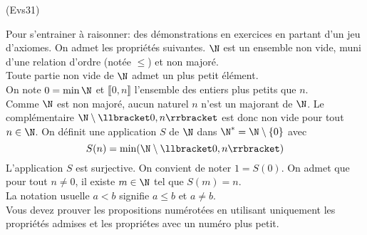 \begin{tiny}(Evs31)\end{tiny} Pour s'entrainer à raisonner: des démonstrations en exercices en partant d'un jeu d'axiomes.\newline
On admet les propriétés suivantes.\newline
$\N$ est un ensemble non vide, muni d'une relation d'ordre (notée $\leq$) et non majoré.\\
Toute partie non vide de $\N$ admet un plus petit élément.\\
On note $0=\min \N$ et $\llbracket 0, n\rrbracket$ l'ensemble des entiers plus petits que $n$.\\
Comme $\N$ est non majoré, aucun naturel $n$ n'est un majorant de $\N$. Le complémentaire $\N\setminus \llbracket 0, n\rrbracket$ est donc non vide pour tout $n\in \N$.
On définit une application $S$ de $\N$ dans $\N^*=\N \setminus\{0\}$ avec
\begin{displaymath}
 S(n) = \min (\N\setminus \llbracket 0, n\rrbracket)
\end{displaymath}
L'application $S$  est surjective.\newline
On convient de noter $1=S(0)$.\newline
On admet que pour tout $n\neq 0$, il existe $m\in \N$ tel que $S(m)=n$.\\
La notation usuelle $a<b$ signifie $a\leq b$ et $a\neq b$.\\
Vous devez prouver les propositions numérotées en utilisant uniquement les propriétés admises et les propriétes avec un numéro plus petit.
